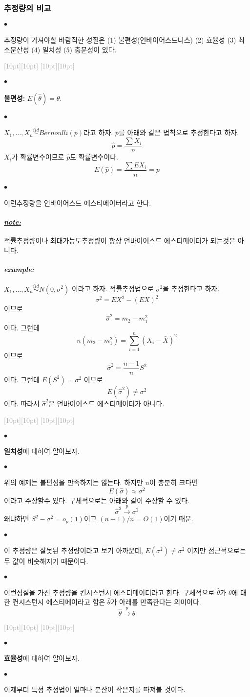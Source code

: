 \documentclass[12pt,oneside,english]{book}
\newcommand{\rdash}{\noindent \textcolor{darkgray}{ \raisebox{-1.9pt}[10pt][10pt]{\leafright} \hrulefill \raisebox{-1.9pt}[10pt][10pt]{\leafright \decofourleft \decothreeleft  \aldineright \decotwo \floweroneleft \decoone}}}
\def\ck{\paragraph{\Large$\bullet$}\Large}
\def\note{\paragraph{\Large\textit{\underline{note:}}}\Large}
\def\ex{\paragraph{\Large\textit{example:}}\Large}
\begin{document}
\subsubsection{추정량의 비교}

\ck 추정량이 가져야할 바람직한 성질은 (1) 불편성(언바이어스드니스) (2) 효율성 (3) 최소분산성 (4) 일치성 (5) 충분성이 있다. 

\rdash 

\ck \textbf{불편성:} $E(\hat\theta)=\theta$. 

\ck $X_1,\dots,X_n \overset{iid}{\sim} Bernoulli(p)$라고 하자. $p$를 아래와 같은 법칙으로 추정한다고 하자. 
\[
\hat{p}=\frac{\sum X_i}{n}
\]
$X_i$가 확률변수이므로 $\hat{p}$도 확률변수이다. 
\[
E(\hat{p})=\frac{\sum E X_i}{n}= p
\]

\ck 이런추정량을 언바이어스드 에스티메이터라고 한다.  

\note 적률추정량이나 최대가능도추정량이 항상 언바이어스드 에스티메이터가 되는것은 아니다. 

\ex $X_1,\dots,X_n \overset{iid}{\sim} N(0,\sigma^2)$ 이라고 하자. 적률추정법으로 $\sigma^2$을 추정한다고 하자. 
\[
\sigma^2=EX^2-(EX)^2
\]
이므로 
\[
\hat\sigma^2=m_2-m_1^2
\]
이다. 그런데 
\[
n(m_2-m_1^2)=\sum_{i=1}^{n}(X_i-\bar{X})^2
\]
이므로 
\[
\hat\sigma^2=\frac{n-1}{n}S^2
\]
이다. 그런데 $E(S^2)=\sigma^2$ 이므로
\[
E(\hat\sigma^2)\neq\sigma^2
\]
이다. 따라서 $\hat\sigma^2$은 언바이어스드 에스티메이터가 아니다. 

\rdash 

\ck \textbf{일치성}에 대하여 알아보자. 

\ck 위의 예제는 불편성을 만족하지는 않는다. 하지만 $n$이 충분히 크다면 
\[
E(\hat \sigma) \approx \sigma^2
\]
이라고 주장할수 있다. 구체적으로는 아래와 같이 주장할 수 있다. 
\[
\hat\sigma^2 \overset{p}{\to} \sigma^2
\]
왜냐하면 $S^2-\sigma^2=o_p(1)$이고 $(n-1)/n=O(1)$이기 때문. 

\ck 이 추정량은 잘못된 추정량이라고 보기 아까운데, $E(\sigma^2)\neq \sigma^2$ 이지만 점근적으로는 두 값이 비슷해지기 때문이다. 

\ck 이런성질을 가진 추정량을 컨시스턴시 에스티메이터라고 한다. 구체적으로 $\hat\theta$가 $\theta$에 대한 컨시스턴시 에스티메이라고 함은 $\hat\theta$가 아래를 만족한다는 의미이다. 
\[
\hat\theta \overset{p}{\to} \theta
\]


\rdash 

\ck \textbf{효율성}에 대하여 알아보자. 

\ck 이제부터 특정 추정법이 얼마나 분산이 작은지를 따져볼 것이다. 
\end{document}

